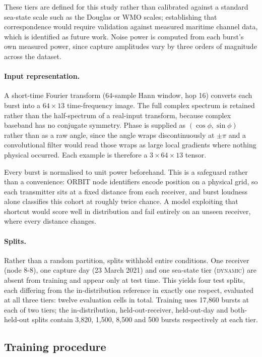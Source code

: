 \documentclass{article}
\begin{document}
These tiers are defined for this study rather than calibrated against a standard
sea-state scale such as the Douglas or WMO scales; establishing that
correspondence would require validation against measured maritime channel data,
which is identified as future work. Noise power is computed from each burst's
own measured power, since capture amplitudes vary by three orders of magnitude
across the dataset.

\paragraph{Input representation.}
A short-time Fourier transform (64-sample Hann window, hop 16) converts each
burst into a $64 \times 13$ time-frequency image. The full complex spectrum is
retained rather than the half-spectrum of a real-input transform, because
complex baseband has no conjugate symmetry. Phase is supplied as
$(\cos\phi, \sin\phi)$ rather than as a raw angle, since the angle wraps
discontinuously at $\pm\pi$ and a convolutional filter would read those wraps as
large local gradients where nothing physical occurred. Each example is therefore
a $3 \times 64 \times 13$ tensor.

Every burst is normalised to unit power beforehand. This is a safeguard rather
than a convenience: ORBIT node identifiers encode position on a physical grid,
so each transmitter sits at a fixed distance from each receiver, and burst
loudness alone classifies this cohort at roughly twice chance. A model
exploiting that shortcut would score well in distribution and fail entirely on
an unseen receiver, where every distance changes.

\paragraph{Splits.}
Rather than a random partition, splits withhold entire conditions. One receiver
(node 8-8), one capture day (23 March 2021) and one sea-state tier
(\textsc{dynamic}) are absent from training and appear only at test time. This
yields four test splits, each differing from the in-distribution reference in
exactly one respect, evaluated at all three tiers: twelve evaluation cells in
total. Training uses 17{,}860 bursts at each of two tiers; the in-distribution,
held-out-receiver, held-out-day and both-held-out splits contain 3{,}820,
1{,}500, 8{,}500 and 500 bursts respectively at each tier.

\subsection{Training procedure}
\end{document}
